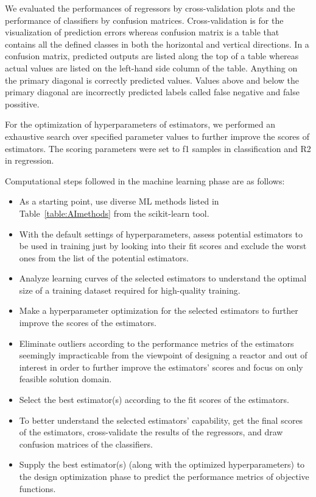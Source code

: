     We evaluated the performances of regressors by cross-validation plots and   the performance of classifiers by confusion matrices. Cross-validation is for the visualization of prediction errors whereas confusion matrix is a table that contains all the defined classes in both the horizontal and vertical directions. In a confusion matrix, predicted outputs are listed along the top of a table whereas actual values are listed on the left-hand side column of the table. Anything on the primary diagonal is correctly predicted values. Values above and below the primary diagonal are incorrectly predicted labels called false negative and false possitive.

    For the optimization of hyperparameters of estimators, we performed an    exhaustive search over specified parameter values to further improve the scores of estimators. The scoring parameters were set to f1 samples in classification and \gls{R2} in regression.

    Computational steps followed in the machine learning phase are as follows:
    \begin{itemize}
    	\item As a starting point, use diverse \gls{ML} methods listed in Table~\ref{table:AImethods} from the scikit-learn tool.
    	\item With the default settings of hyperparameters, assess potential estimators to be used in training just by looking into their fit scores and exclude the worst ones from the list of the potential estimators.
    	\item Analyze learning curves of the selected estimators to understand the optimal size of a training dataset required for high-quality training.
    	\item Make a hyperparameter optimization for the selected estimators to further improve the scores of the estimators.
    	\item Eliminate outliers according to the performance metrics of the estimators seemingly impracticable from the viewpoint of designing a reactor and out of interest in order to further improve the estimators' scores and focus on only feasible solution domain.
    	\item Select the best estimator(s) according to the fit scores of the estimators.
    	\item To better understand the selected estimators' capability, get the final scores of the estimators, cross-validate the results of the	regressors, and draw confusion matrices of the classifiers.
    	\item Supply the best estimator(s) (along with the optimized hyperparameters) to the design optimization phase to predict the performance	metrics of objective functions.
    \end{itemize}

